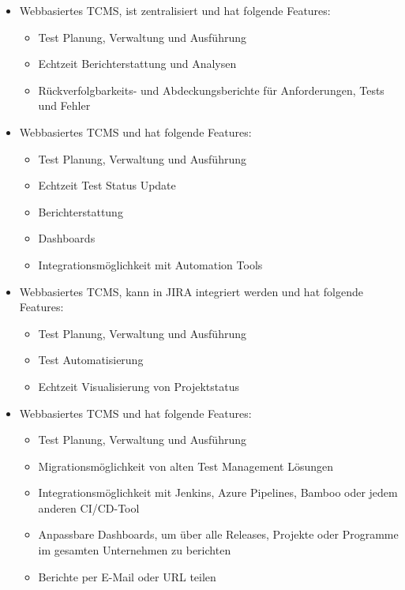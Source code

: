 \documentclass[a4paper, fontsize=11pt, parskip=half, twoside]{scrreprt}
\begin{document}
	\begin{itemize}
		\item \textcite{noauthor_testrail_2023} 
		
		Webbasiertes \ac{TCMS}, ist zentralisiert und hat folgende Features:
		
		\begin{itemize}
			\setlength\itemsep{-0.5em}
			\item Test Planung, Verwaltung und Ausführung 
			\item Echtzeit Berichterstattung und Analysen
			\item Rückverfolgbarkeits- und Abdeckungsberichte für Anforderungen, Tests und Fehler
		\end{itemize}
		
		\item \textcite{noauthor_practitest_nodate} 
		
		Webbasiertes \ac{TCMS} und hat folgende Features:
		
		\begin{itemize}
			\setlength\itemsep{-0.5em}
			\item Test Planung, Verwaltung und Ausführung 
			\item Echtzeit Test Status Update
			\item Berichterstattung
			\item Dashboards
			\item Integrationsmöglichkeit mit Automation Tools
		\end{itemize}
		
		\item \textcite{noauthor_zephyr_nodate} 
		
		Webbasiertes \ac{TCMS}, kann in JIRA integriert werden und hat folgende Features:
		
		\begin{itemize}
			\setlength\itemsep{-0.5em}
			\item Test Planung, Verwaltung und Ausführung 
			\item Test Automatisierung
			\item Echtzeit Visualisierung von Projektstatus
		\end{itemize}
		
		\item \textcite{noauthor_tricentis_nodate} 
		
		Webbasiertes \ac{TCMS} und hat folgende Features:
		
		\begin{itemize}
			\setlength\itemsep{-0.5em}
			\item Test Planung, Verwaltung und Ausführung 
			\item Migrationsmöglichkeit von alten Test Management Lösungen
			\item Integrationsmöglichkeit mit Jenkins, Azure Pipelines, Bamboo oder jedem anderen CI/CD-Tool
			\item Anpassbare Dashboards, um über alle Releases, Projekte oder Programme im gesamten Unternehmen zu berichten
			\item Berichte per E-Mail oder URL teilen
		\end{itemize}
	\end{itemize}
	
\end{document}
